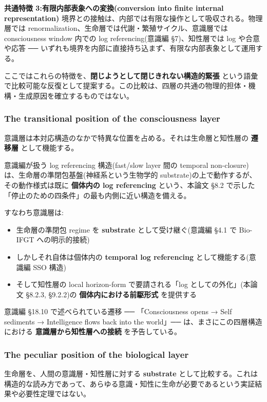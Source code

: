 \textbf{共通特徴 3:有限内部表象への変換(conversion into finite internal representation)}
境界との接触は、内部では有限な操作として吸収される。物理層では renormalization、生命層では代謝・繁殖サイクル、意識層では consciousness window 内での log referencing(意識編 \S{}7)、知性層では log や合意や応答 ── いずれも境界を内部に直接持ち込まず、有限な内部表象として運用する。

ここではこれらの特徴を、\textbf{閉じようとして閉じきれない構造的緊張} という語彙で比較可能な反復として提案する。この比較は、四層の共通の物理的担体・機構・生成原因を確立するものではない。

\subsubsection{The transitional position of the consciousness layer}


意識層は本対応構造のなかで特異な位置を占める。それは生命層と知性層の \textbf{遷移層} として機能する。

意識編が扱う log referencing 構造(fast/slow layer 間の temporal non-closure)は、生命層の準閉包基盤(神経系という生物学的 substrate)の上で動作するが、その動作様式は既に \textbf{個体内の log referencing} という、本論文 \S{}8.2 で示した「停止のための四条件」の最も内側に近い構造を備える。

すなわち意識層は:

\begin{itemize}
\item 生命層の準閉包 regime を \textbf{substrate} として受け継ぐ(意識編 \S{}4.1 で Bio-IFGT への明示的接続)
\item しかしそれ自体は個体内の \textbf{temporal log referencing} として機能する(意識編 SSO 構造)
\item そして知性層の local horizon-form で要請される「log としての外化」(本論文 \S{}8.2.3, \S{}9.2.2)の \textbf{個体内における前駆形式} を提供する
\end{itemize}

意識編 \S{}18.10 で述べられている遷移 ── 「Consciousness opens → Self sediments → Intelligence flows back into the world」── は、まさにこの四層構造における \textbf{意識層から知性層への接続} を予告している。

\subsubsection{The peculiar position of the biological layer}


生命層を、人間の意識層・知性層に対する \textbf{substrate} として比較する。これは構造的な読み方であって、あらゆる意識・知性に生命が必要であるという実証結果や必要性定理ではない。

